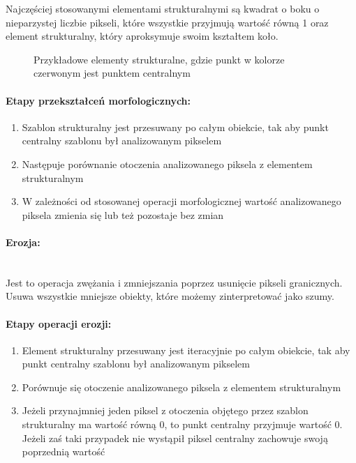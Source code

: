 \documentclass[a4paper,12pt,twoside,openany]{report}
\newcommand{\ImgPath}{.}
\begin{document}
Najczęściej stosowanymi elementami strukturalnymi są kwadrat o boku o nieparzystej liczbie pikseli, które wszystkie przyjmują wartość równą 1 oraz element strukturalny, który aproksymuje swoim kształtem koło.

\begin{figure}[H]
	\centering
	\caption{Przykładowe elementy strukturalne, gdzie punkt w kolorze czerwonym jest punktem centralnym}
\end{figure}

\paragraph{Etapy przekształceń morfologicznych:}
\begin{enumerate}
	\item Szablon strukturalny jest przesuwany po całym obiekcie, tak aby punkt centralny szablonu był analizowanym pikselem
	\item Następuje porównanie otoczenia analizowanego piksela z elementem strukturalnym
	\item W zależności od stosowanej operacji morfologicznej wartość analizowanego piksela zmienia się lub też pozostaje bez zmian
\end{enumerate}

\paragraph{Erozja:}\mbox{} \\
Jest to operacja zwężania i zmniejszania poprzez usunięcie pikseli granicznych. Usuwa wszystkie mniejsze obiekty, które możemy zinterpretować jako szumy. 

\paragraph{Etapy operacji erozji:}
\begin{enumerate}
	\item Element strukturalny przesuwany jest iteracyjnie po całym obiekcie,  tak aby punkt centralny szablonu był analizowanym pikselem
	\item Porównuje się otoczenie analizowanego piksela z elementem strukturalnym
	\item  Jeżeli przynajmniej jeden piksel z otoczenia objętego przez szablon strukturalny ma wartość równą 0, to punkt centralny przyjmuje wartość 0. Jeżeli zaś taki przypadek nie wystąpił piksel centralny zachowuje swoją poprzednią wartość
\end{enumerate}
\end{document}
